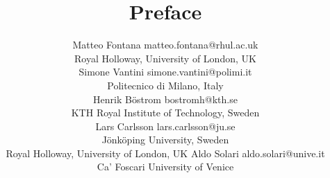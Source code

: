 \documentclass[twoside,11pt]{article}
\begin{document}
\title{Preface}

\author{\name Matteo Fontana \email matteo.fontana@rhul.ac.uk \\
       \addr Royal Holloway, University of London, UK\\
       \AND
       \name Simone Vantini \email simone.vantini@polimi.it \\
       \addr Politecnico di Milano, Italy\\
       \AND
       \name Henrik Böstrom \email bostromh@kth.se \\
       \addr KTH Royal Institute of Technology, Sweden\\
       \AND
       \name Lars Carlsson \email lars.carlsson@ju.se \\
       \addr Jönköping University, Sweden\\
       Royal Holloway, University of London, UK
       \AND
       \name Aldo Solari \email aldo.solari@unive.it \\
       \addr Ca' Foscari University of Venice\\
}
\end{document}
